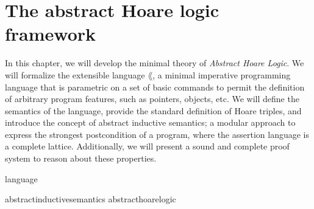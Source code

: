 \chapter{The abstract Hoare logic framework}


In this chapter, we will develop the minimal theory of \textit{Abstract Hoare
Logic}. We will formalize the extensible language $\lang$, a minimal imperative
programming language that is parametric on a set of basic commands to permit
the definition of arbitrary program features, such as pointers, objects, etc.
We will define the semantics of the language, provide the standard definition
of Hoare triples, and introduce the concept of abstract inductive semantics; a
modular approach to express the strongest postcondition of a program, where the
assertion language is a complete lattice. Additionally, we will present a sound
and complete proof system to reason about these properties.

{language}

{abstractinductivesemantics}
{abstracthoarelogic}
